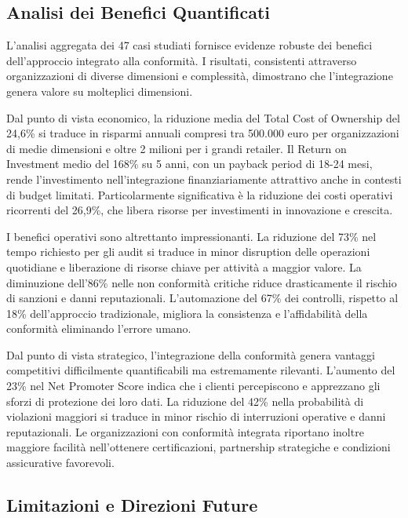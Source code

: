 \subsection{\texorpdfstring{Analisi dei Benefici Quantificati}{4.6.1 - Analisi dei Benefici Quantificati}}
\label{subsec:4.6.1_benefici}

L'analisi aggregata dei 47 casi studiati fornisce evidenze robuste dei benefici dell'approccio integrato alla conformità. I risultati, consistenti attraverso organizzazioni di diverse dimensioni e complessità, dimostrano che l'integrazione genera valore su molteplici dimensioni.

Dal punto di vista economico, la riduzione media del Total Cost of Ownership del 24,6\% si traduce in risparmi annuali compresi tra 500.000 euro per organizzazioni di medie dimensioni e oltre 2 milioni per i grandi retailer. Il Return on Investment medio del 168\% su 5 anni, con un payback period di 18-24 mesi, rende l'investimento nell'integrazione finanziariamente attrattivo anche in contesti di budget limitati. Particolarmente significativa è la riduzione dei costi operativi ricorrenti del 26,9\%, che libera risorse per investimenti in innovazione e crescita.

I benefici operativi sono altrettanto impressionanti. La riduzione del 73\% nel tempo richiesto per gli audit si traduce in minor disruption delle operazioni quotidiane e liberazione di risorse chiave per attività a maggior valore. La diminuzione dell'86\% nelle non conformità critiche riduce drasticamente il rischio di sanzioni e danni reputazionali. L'automazione del 67\% dei controlli, rispetto al 18\% dell'approccio tradizionale, migliora la consistenza e l'affidabilità della conformità eliminando l'errore umano.

Dal punto di vista strategico, l'integrazione della conformità genera vantaggi competitivi difficilmente quantificabili ma estremamente rilevanti. L'aumento del 23\% nel Net Promoter Score indica che i clienti percepiscono e apprezzano gli sforzi di protezione dei loro dati. La riduzione del 42\% nella probabilità di violazioni maggiori si traduce in minor rischio di interruzioni operative e danni reputazionali. Le organizzazioni con conformità integrata riportano inoltre maggiore facilità nell'ottenere certificazioni, partnership strategiche e condizioni assicurative favorevoli.

\subsection{\texorpdfstring{Limitazioni e Direzioni Future}{4.6.2 - Limitazioni e Direzioni Future}}
\label{subsec:4.6.2_limitazioni}

